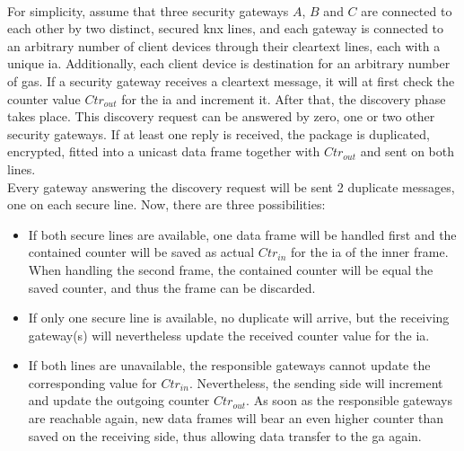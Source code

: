 \\
For simplicity, assume that three security gateways $A$, $B$ and $C$ are connected to each other by two distinct, secured \gls{knx} lines, and each gateway is connected
to an arbitrary number of client devices through their cleartext lines, each with a unique \gls{ia}.
Additionally, each client device is destination for an arbitrary number of \glspl{ga}.
If a security gateway receives a cleartext message, it will at first check the counter value $Ctr_{out}$ for the \gls{ia} and increment it. After that, the 
discovery phase takes place. This discovery request can be answered by zero, one or two other security gateways. If at least one reply is received, the package
is duplicated, encrypted, fitted into a unicast data frame together with $Ctr_{out}$ and sent on both lines.
\\
Every gateway answering the discovery request will be sent 2 duplicate messages, one on each secure line. Now, there are three possibilities:
\begin{itemize}
 \item If both secure lines are available, one data frame will be handled first and the contained counter will be saved as actual $Ctr_{in}$ for the \gls{ia}
 of the inner frame. When handling the second frame, the contained counter will be equal the saved counter, and thus the frame can be discarded.
 \item If only one secure line is available, no duplicate will arrive, but the receiving gateway(s) will nevertheless update the received counter value for the
 \gls{ia}.
 \item If both lines are unavailable, the responsible gateways cannot update the corresponding value for $Ctr_{in}$. Nevertheless, the sending side will 
 increment and update
 the outgoing counter $Ctr_{out}$. As soon as the responsible gateways are reachable again, new data frames will bear an even higher counter than saved on the
 receiving side, thus allowing data transfer to the \gls{ga} again.
\end{itemize}



